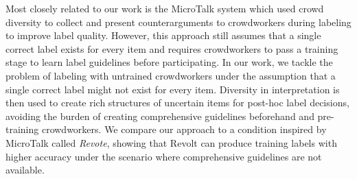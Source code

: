 Most closely related to our work is the MicroTalk system \cite{drapeau2016microtalk} which used crowd diversity to collect and present counterarguments to crowdworkers during labeling to improve label quality. However, this approach still assumes that a single correct label exists for every item and requires crowdworkers to pass a training stage to learn label guidelines before participating. In our work, we tackle the problem of labeling with untrained crowdworkers under the assumption that a single correct label might not exist for every item. Diversity in interpretation is then used to create rich structures of uncertain items for post-hoc label decisions, avoiding the burden of creating comprehensive guidelines beforehand and pre-training crowdworkers. We compare our approach to a condition inspired by MicroTalk called \emph{Revote}, showing that Revolt can produce training labels with higher accuracy under the scenario where comprehensive guidelines are not available.






